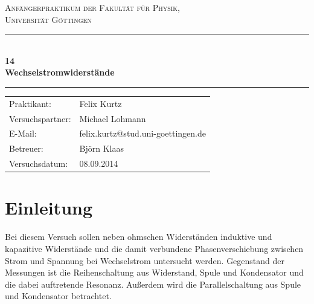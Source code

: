 \documentclass[12pt,a4paper,titlepage,headinclude,bibtotoc]{scrartcl}
\begin{document}
\begin{titlepage}
\centering
\textsc{\Large Anfängerpraktikum der Fakultät für
  Physik,\\[1.5ex] Universität Göttingen}

\vspace*{4.2cm}

\rule{\textwidth}{1pt}\\[0.5cm]
{\huge \bfseries
  14\\[1.5ex]
  Wechselstromwiderstände}\\[0.5cm]
\rule{\textwidth}{1pt}

\vspace*{2.5cm}

\begin{Large}
\begin{tabular}{ll}
Praktikant: & Felix Kurtz\\
Versuchspartner: & Michael Lohmann\\
 E-Mail: &  felix.kurtz@stud.uni-goettingen.de\\
 Betreuer: & Björn Klaas\\
 Versuchsdatum: & 08.09.2014\\
\end{tabular}
\end{Large}

\vspace*{0.8cm}

\begin{Large}
\end{Large}

\end{titlepage}

\tableofcontents

\newpage

\section{Einleitung}
\label{sec:einleitung}
Bei diesem Versuch sollen neben ohmschen Widerständen induktive und kapazitive Widerstände und die damit verbundene Phasenverschiebung zwischen Strom und Spannung bei Wechselstrom untersucht werden.
Gegenstand der Messungen ist die Reihenschaltung aus Widerstand, Spule und Kondensator und die dabei auftretende Resonanz.
Außerdem wird die Parallelschaltung aus Spule und Kondensator betrachtet.
\end{document}
